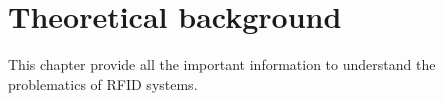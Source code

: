 \chapter{Theoretical background}
\label{chap:theory}

This chapter provide all the important information to understand the problematics of RFID systems.
